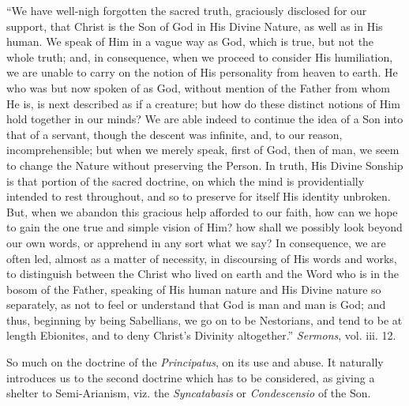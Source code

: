 ``We have well-nigh forgotten the sacred truth, graciously
disclosed for our support, that Christ is the Son of God in His Divine
Nature, as well as in His human. We speak of Him in a vague way as
God, which is true, but not the whole truth; and, in consequence, when
we proceed to consider His humiliation, we are unable to carry on the
notion of His personality from heaven to earth. He who was but now
spoken of as God, without mention of the Father from whom He is, is
next described as if a creature; but how do these distinct notions of
Him hold together in our minds? We are able indeed to continue the
idea of a Son into that of a servant, though the descent was infinite,
and, to our reason, incomprehensible; but when we merely speak, first
of God, then of man, we seem to change the Nature without preserving
the Person. In truth, His Divine Sonship is that portion of the sacred
doctrine, on which the mind is providentially intended to rest
throughout, and so to preserve for itself His identity unbroken. But, when we abandon this gracious help afforded to our faith, how can
we hope to gain the one true and simple vision of Him? how shall we
possibly look beyond our own words, or apprehend in any sort what we
say? In consequence, we are often led, almost as a matter of
necessity, in discoursing of His words and works, to distinguish
between the Christ who lived on earth and the Word who is in the bosom
of the Father, speaking of His human nature and His Divine nature so
separately, as not to feel or understand that God is man and man is
God; and thus, beginning by being Sabellians, we go on to be
Nestorians, and tend to be at length Ebionites, and to deny Christ's
Divinity altogether.'' \emph{Sermons},
vol. iii. 12.

So much on the doctrine of the \emph{Principatus}, on its use and
abuse. It naturally introduces us to the second doctrine which has to
be considered, as giving a shelter to Semi-Arianism, viz. the \emph{Syncatabasis}
or \emph{Condescensio} of the Son.


